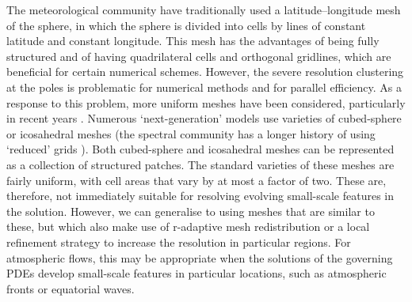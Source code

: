 \documentclass[11pt, a4paper]{scrartcl}  %
\theoremstyle{plain}
\theoremstyle{definition}
\numberwithin{equation}{section}
\begin{document}
The meteorological community have traditionally used a
latitude--longitude mesh of the sphere, in which the sphere is divided
into cells by lines of constant latitude and constant longitude. This
mesh has the advantages of being fully structured and of having
quadrilateral cells and orthogonal gridlines, which are beneficial for
certain numerical schemes. However, the severe resolution clustering at
the poles is problematic for numerical methods and for parallel
efficiency. As a response to this problem, more uniform meshes have been
considered, particularly in recent years
\citep{williamson2007evolution,staniforth2012horizontal}. Numerous
`next-generation' models use varieties of cubed-sphere or icosahedral
meshes \citep{ullrich2017dcmip} (the spectral community has a longer
history of using `reduced' grids \citep{hortal1991reduced}). Both
cubed-sphere and icosahedral meshes can be represented as a collection
of structured patches. The standard varieties of these meshes are fairly
uniform, with cell areas that vary by at most a factor of two. These
are, therefore, not immediately suitable for resolving evolving
small-scale features in the solution. However, we can generalise to
using meshes that are similar to these, but which also make use of
r-adaptive mesh redistribution or a local refinement strategy to
increase the resolution in particular regions. For atmospheric flows,
this may be appropriate when the solutions of the governing PDEs develop
small-scale features in particular locations, such as atmospheric fronts
or equatorial waves.
\end{document}

